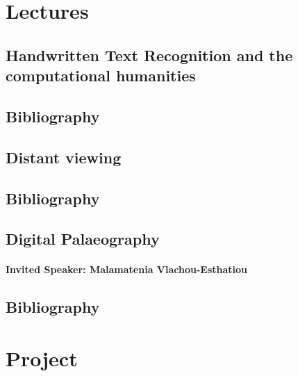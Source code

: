 \documentclass{report}
\begin{document}
\section{Lectures}

\subsection{Handwritten Text Recognition and the computational humanities}

\subsection*{Bibliography}

\subsection{Distant viewing}

\subsection*{Bibliography}

\cite{lang2023}

\subsection{Digital Palaeography}

\paragraph{Invited Speaker: Malamatenia Vlachou-Esthatiou}

\subsection*{Bibliography}

\section{Project}
\end{document}
